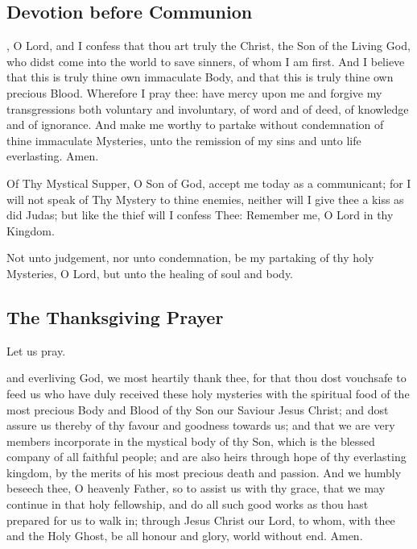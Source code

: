 \subsection{Devotion before Communion}
, O Lord, and I confess that thou art truly the Christ, the Son of the Living God, who didst come into the world to save sinners, of whom I am first. And I believe that this is truly thine own immaculate Body, and that this is truly thine own precious Blood. Wherefore I pray thee: have mercy upon me and forgive my transgressions both voluntary and involuntary, of word and of deed, of knowledge and of ignorance. And make me worthy to partake without condemnation of thine immaculate Mysteries, unto the remission of my sins and unto life everlasting. Amen.
\par
Of Thy Mystical Supper, O Son of God, accept me today as a communicant; for I will not speak of Thy Mystery to thine enemies, neither will I give thee a kiss as did Judas; but like the thief will I confess Thee: Remember me, O Lord in thy Kingdom.
\par
Not unto judgement, nor unto condemnation, be my partaking of thy holy Mysteries, O Lord, but unto the healing of soul and body.
\subsection{The Thanksgiving Prayer}
Let us pray.
\par
{} and everliving God, we most heartily thank thee, for that thou dost vouchsafe to feed us who have duly received these holy mysteries with the spiritual food of the most precious Body and Blood of thy Son our Saviour Jesus Christ; and dost assure us thereby of thy favour and goodness towards us; and that we are very members incorporate in the mystical body of thy Son, which is the blessed company of all faithful people; and are also heirs through hope of thy everlasting kingdom, by the merits of his most precious death and passion. And we humbly beseech thee, O heavenly Father, so to assist us with thy grace, that we may continue in that holy fellowship, and do all such good works as thou hast prepared for us to walk in; through Jesus Christ our Lord, to whom, with thee and the Holy Ghost, be all honour and glory, world without end. Amen.
